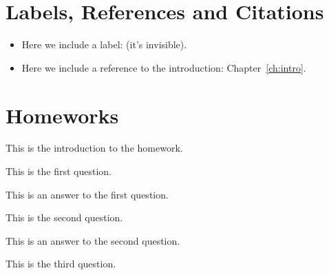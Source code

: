 \documentclass{camel}
\begin{document}
\chapter{Labels, References and Citations}

\begin{itemize}
\item Here we include a label: \label{it:first-item} (it's invisible).
\item Here we include a reference to the introduction: Chapter~\ref{ch:intro}.
\end{itemize}

\chapter{Homeworks}\label{ch:homeworks}

\begin{homework}\label{hwk:demo}
This is the introduction to the homework.
\begin{questions} 
\question This is the first question.\label{qu:first-question}
\begin{answer} 
This is an answer to the first question.
\end{answer} 
\question This is the second question.\label{qu:second-question}
\begin{answer} 
This is an answer to the second question.
\end{answer} 
\question This is the third question.\label{qu:third-question}
\end{questions} 
\end{homework}
\end{document}

